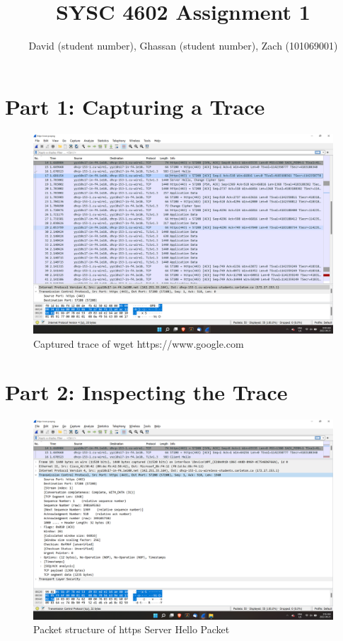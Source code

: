 \documentclass{report}
\begin{document}
    \title  { \textbf{SYSC 4602 Assignment 1} }
    \author {
        David (student number),
        Ghassan (student number),
        Zach (101069001)
    }

    \maketitle

    \chapter*{Part 1: Capturing a Trace}
    \begin{figure}[h]
        \includegraphics[width=\textwidth]{images/trace-https.png}
        \caption{Captured trace of wget https://www.google.com}
    \end{figure}

    \chapter*{Part 2: Inspecting the Trace}
    \begin{figure}[h]
        \includegraphics[width=\textwidth]{images/https-server-hello-structure-1.png}
        \caption{Packet structure of https Server Hello Packet}
    \end{figure}
\end{document}
